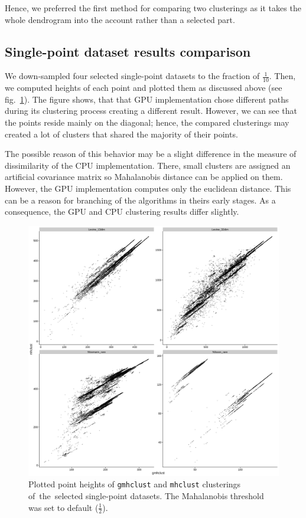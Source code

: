Hence, we preferred the first method for comparing two clusterings as it takes the whole dendrogram into the account rather than a selected part.

\subsection{Single-point dataset results comparison}

We down-sampled four selected single-point datasets to the fraction of $\frac{1}{10}$. Then, we computed heights of each point and plotted them as discussed above (see fig.~\ref{fig04:single_result}). The figure shows, that that GPU implementation chose different paths during its clustering process creating a different result. However, we can see that the points reside mainly on the diagonal; hence, the compared clusterings may created a lot of clusters that shared the majority of their points.

The possible reason of this behavior may be a slight difference in the measure of dissimilarity of the CPU implementation. There, small clusters are assigned an artificial covariance matrix so Mahalanobis distance can be applied on them. However, the GPU implementation computes only the euclidean distance. This can be a reason for branching of the algorithms in theirs early stages. As a consequence, the GPU and CPU clustering results differ slightly.

\begin{figure}\centering
	\includegraphics[width=\linewidth]{img/single_result}
	\caption{Plotted point heights of \texttt{gmhclust} and \texttt{mhclust} clusterings of~the~selected single-point datasets. The Mahalanobis threshold was set to default ($\frac{1}{2}$).}
	\label{fig04:single_result}
\end{figure}

